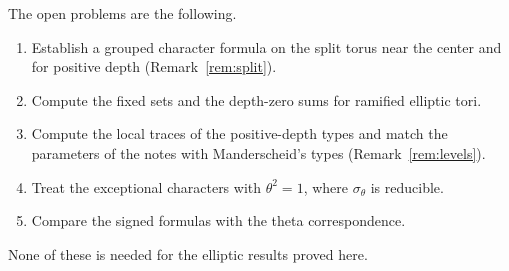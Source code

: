 \documentclass[12pt,letterpaper]{article}
\numberwithin{equation}{section}
\theoremstyle{definition}
\theoremstyle{remark}
\begin{document}
The open problems are the following.
\begin{enumerate}[leftmargin=2em]
\item Establish a grouped character formula on the split torus near the center and for positive depth (Remark~\ref{rem:split}).
\item Compute the fixed sets and the depth-zero sums for ramified elliptic tori.
\item Compute the local traces of the positive-depth types and match the parameters of the notes with Manderscheid's types (Remark~\ref{rem:levels}).
\item Treat the exceptional characters with $\theta^2=1$, where $\sigma_\theta$ is reducible.
\item Compare the signed formulas with the theta correspondence.
\end{enumerate}
None of these is needed for the elliptic results proved here.
\end{document}
